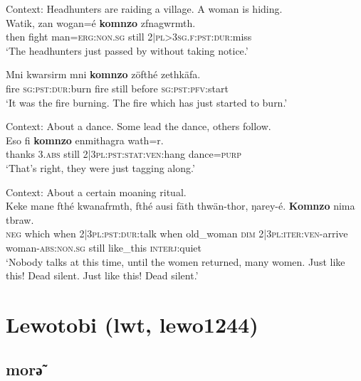 \begin{exe}
	\ex \label{exAppendixKomnzoRestrictive1}
	Context: Headhunters are raiding a village. A woman is hiding.\\
	\gll Watik, zan wogan=é \textbf{komnzo} zfnagwrmth.\\
then fight man=\textsc{erg}:\textsc{non}.\textsc{sg} still 2$|$\textsc{pl}>3\textsc{sg.f}:\textsc{pst}:\textsc{dur}:miss\\
	\glt \lq The headhunters just passed by without taking notice.' \parencite{Doehler2020}

	\ex \label{exAppendixKomnzoRestrictive2}
	\gll Mni kwarsirm mni \textbf{komnzo} zöfthé zethkäfa.\\
fire \textsc{sg}:\textsc{pst}:\textsc{dur}:burn fire still before \textsc{sg}:\textsc{pst}:\textsc{pfv}:start\\
	\glt \lq It was the fire burning. The fire which has just started to burn.\rq{ }\parencite[372]{Doehler2018}

	\ex \label{exAppendixKomnzoRestrictive3}
	Context: About a dance. Some lead the dance, others follow.\\
	\gll Eso fi \textbf{komnzo} enmithagra wath=r.\\
thanks 3.\textsc{abs} still 2|3\textsc{pl}:\textsc{pst}:\textsc{stat}:\textsc{ven}:hang dance=\textsc{purp}\\
	\glt \lq That's right, they were just tagging along.' \parencite{Doehler2020}

	\ex \label{exAppendixKomnzoRestrictive4}
	Context: About a certain moaning ritual.\\
	\gll Keke mane fthé kwanafrmth, fthé ausi fäth thwän-thor, ŋarey-é. \textbf{Komnzo} nima tbraw.\\
	\textsc{neg} which when 2|3\textsc{pl}:\textsc{pst}:\textsc{dur}:talk when old\_woman \textsc{dim} 2|3\textsc{pl}:\textsc{iter}:\textsc{ven}-arrive woman-\textsc{abs}:\textsc{non}.\textsc{sg} still like\_this \textsc{interj}:quiet\\
	\glt \lq Nobody talks at this time, until the women returned, many women. Just like this! Dead silent. Just like this! Dead silent.' \parencite{Doehler2020}
\end{exe}

\section{Lewotobi (lwt, lewo1244)}
\subsection{morә̃}

